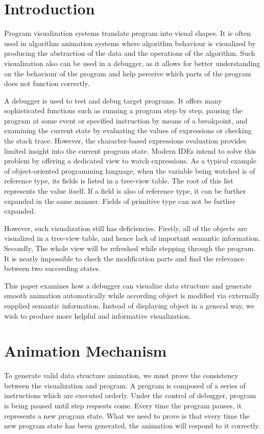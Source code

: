 \documentclass [a4paper,11pt]{article}
\begin{document}
\section {Introduction}

Program visualization systems translate program into visual shapes. It is often used in algorithm animation systems where algorithm behaviour is visualized by producing the abstraction of the data and the operations of the algorithm. Such visualization also can be used in a debugger, as it allows for better understanding on the behaviour of the program and help perceive which parts of the program does not function correctly.

A debugger is used to test and debug target programs. It offers many sophisticated functions such as running a program step by step, pausing the program at some event or specified instruction by means of a breakpoint, and examining the current state by evaluating the values of expressions or checking the stack trace. However, the character-based expressions evaluation provides limited insight into the current program state. Modern IDEs intend to solve this problem by offering a dedicated view to watch expressions. As a typical example of object-oriented programming language, when the variable being watched is of reference type, its fields is listed in a tree-view table. The root of this list represents the value itself. If a field is also of reference type, it can be further expanded in the same manner. Fields of primitive type can not be further expanded.

However, such visualization still has deficiencies. Firstly, all of the objects are visualized in a tree-view table, and hence lack of important semantic information. Secondly, The whole view will be refreshed while stepping through the program. It is nearly impossible to check the modification parts and find the relevance between two succeeding states.

This paper examines how a debugger can visualize data structure and generate smooth animation automatically while according object is modified via externally supplied semantic information. Instead of displaying object in a general way, we wish to produce more helpful and informative visualization.

\section {Animation Mechanism}
To generate valid data structure animation, we must prove the consistency between the visualization and program. A program is composed of a series of instructions which are executed orderly. Under the control of debugger, program is being paused until step requests come. Every time the program pauses, it represents a new program state. What we need to prove is that every time the new program state has been generated, the animation will respond to it correctly.
\end{document}
